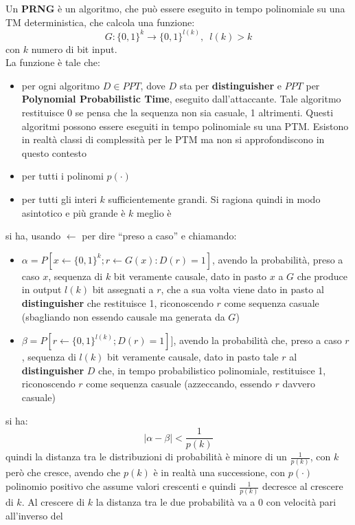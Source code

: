 \documentclass[a4paper,12pt, oneside]{book}
\begin{document}
\begin{definizione}
  Un \textbf{PRNG} è un algoritmo, che può essere eseguito in tempo polinomiale
  su una TM deterministica, che calcola una funzione:
  \[G:\{0,1\}^k\to\{0,1\}^{l(k)},\,\,\,l(k)>k\]
  con $k$ numero di bit input.\\
  La funzione è tale che:
  \begin{itemize}
    \item per ogni algoritmo $D\in PPT$, dove $D$ sta per
    \textbf{distinguisher} e $PPT$ per \textbf{Polynomial Probabilistic Time},
    eseguito dall'attaccante. Tale algoritmo restituisce 
    0 se pensa che la sequenza non sia casuale, 1 altrimenti. Questi algoritmi
    possono essere eseguiti in tempo polinomiale su una PTM. Esistono in realtà
    classi di complessità per le PTM ma non si approfondiscono in questo
    contesto
    \item per tutti i polinomi $p(\cdot)$
    \item per tutti gli interi $k$ sufficientemente grandi. Si ragiona quindi in
    modo asintotico e più grande è $k$ meglio è
  \end{itemize}
  si ha, usando $\gets$ per dire ``preso a caso'' e chiamando:
  \begin{itemize}
    \item $\alpha=P[ x \gets \{0,1\}^k ; r \gets G(x) : D(r) = 1]$, avendo la
    probabilità, preso a caso $x$, sequenza di $k$ bit veramente causale, dato
    in pasto $x$ a $G$ che produce in output $l(k)$ bit assegnati a $r$, che a
    sua volta viene dato in pasto al \textbf{distinguisher} che restituisce 1,
    riconoscendo $r$ come sequenza casuale (sbagliando non essendo causale ma
    generata da $G$)
    \item $\beta=P[ r \gets \{0,1\}^{l(k)} ;  D(r) = 1]]$, avendo la probabilità
    che, preso a caso $r$, sequenza di $l(k)$ bit veramente causale, dato in
    pasto tale $r$ al \textbf{distinguisher} $D$ che, in tempo probabilistico
    polinomiale, restituisce 1, riconoscendo $r$ come sequenza casuale
    (azzeccando, essendo $r$ davvero casuale)
  \end{itemize}
  si ha:
  \[|\alpha-\beta|<\frac{1}{p(k)}\]
  quindi la distanza tra le distribuzioni di probabilità è minore di un
  $\frac{1}{p(k)}$, con $k$ però che cresce, avendo che $p(k)$ è in realtà una
  successione, con $p(\cdot)$ polinomio positivo che assume valori crescenti e
  quindi $\frac{1}{p(k)}$ decresce al crescere di $k$. Al crescere di $k$ la
  distanza tra le due probabilità va a 0 con velocità pari all'inverso del

\end{definizione}
\end{document}
